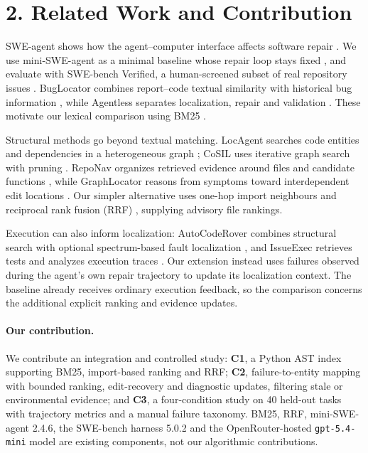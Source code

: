 \section*{2. Related Work and Contribution}

SWE-agent shows how the agent--computer interface affects software repair
\cite{yang2024sweagent}. We use mini-SWE-agent as a minimal baseline whose repair loop stays
fixed \cite{minisweagent}, and evaluate with SWE-bench Verified, a human-screened subset of
real repository issues \cite{jimenez2024swebench,openai2024verified}. BugLocator combines
report--code textual similarity with historical bug information \cite{zhou2012buglocator},
while Agentless separates localization, repair and validation \cite{xia2024agentless}.
These motivate our lexical comparison using BM25 \cite{robertson2009bm25}.

Structural methods go beyond textual matching. LocAgent searches code entities and dependencies
in a heterogeneous graph \cite{chen2025locagent}; CoSIL uses iterative graph search with pruning
\cite{jiang2025cosil}. RepoNav organizes retrieved evidence around files and candidate functions
\cite{chai2026reponav}, while GraphLocator reasons from symptoms toward interdependent edit
locations \cite{liu2025graphlocator}. Our simpler alternative uses one-hop import neighbours
and reciprocal rank fusion (RRF) \cite{cormack2009rrf}, supplying advisory file rankings.

Execution can also inform localization: AutoCodeRover combines structural search with optional
spectrum-based fault localization \cite{zhang2024autocoderover}, and IssueExec retrieves tests
and analyzes execution traces \cite{liu2026issueexec}. Our extension instead uses failures
observed during the agent's own repair trajectory to update its localization context.
The baseline already receives ordinary execution feedback, so the comparison concerns the
additional explicit ranking and evidence updates.

\paragraph{Our contribution.}
We contribute an integration and controlled study: \textbf{C1}, a Python AST index supporting
BM25, import-based ranking and RRF; \textbf{C2}, failure-to-entity mapping with bounded ranking,
edit-recovery and diagnostic updates, filtering stale or environmental evidence; and
\textbf{C3}, a four-condition study on 40 held-out tasks with trajectory metrics and a manual
failure taxonomy. BM25, RRF, mini-SWE-agent 2.4.6, the SWE-bench harness 5.0.2 and the
OpenRouter-hosted \texttt{gpt-5.4-mini} model are existing components, not our algorithmic contributions.
